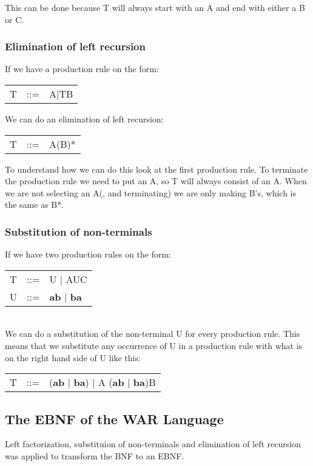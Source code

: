 			This can be done because T will always start with an A and end with either a B or C.
			
		\subsubsection*{Elimination of left recursion}
			If we have a production rule on the form: \\
			\begin{tabular}{l l l}
				T		&	::=		&	A$\mid$TB \\
			\end{tabular}
			
			We can do an elimination of left recursion: \\
			\begin{tabular}{l l l}
				T		&	::=		&	A(B)* \\
			\end{tabular}
			
			To understand how we can do this look at the first production rule. To terminate the production rule we need 
			to put an A, so T will always consist of an A. When we are not selecting an A(, and terminating) we are only making B's, which is
			the same as B*.
		\subsubsection*{Substitution of non-terminals}
			If we have two production rules on the form: \\
			
			\begin{tabular}{l l l}
				T		&	::=		&	U $\mid$ AUC \\
				U		&	::=		&	{\bf ab} $\mid$ {\bf ba} \\
			\end{tabular} \\
			
			We can do a substitution of the non-terminal U for every production rule. This means that we 
			substitute any occurrence of U in a production rule with what is on the right hand side of U like this: \\
			
			\begin{tabular}{l l l}
				T		&	::=		&	({\bf ab} $\mid$ {\bf ba}) $\mid$ A ({\bf ab} $\mid$ {\bf ba})B \\
			\end{tabular}
	\subsection{The EBNF of the WAR Language}
		Left factorization, substituion of non-terminals 
		and elimination of left recursion was applied to transform the BNF to an EBNF. \\
		
